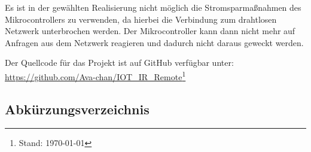 Es ist in der gewählten Realisierung nicht möglich die Stromsparmaßnahmen des Mikrocontrollers zu verwenden, da hierbei die Verbindung zum drahtlosen Netzwerk unterbrochen werden. 
Der Mikrocontroller kann dann nicht mehr auf Anfragen aus dem Netzwerk reagieren und dadurch nicht daraus geweckt werden.

Der Quellcode für das Projekt ist auf GitHub verfügbar unter:\\ \url{https://github.com/Ava-chan/IOT_IR_Remote}\footnote{Stand: \today}

\pagebreak

\begin{appendix}
\pagestyle{empty}	
\section{Abkürzungsverzeichnis}


\end{appendix}
